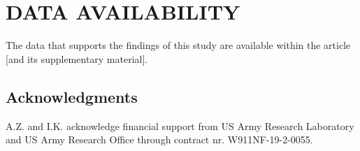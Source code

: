 \documentclass[pre,twocolumn,aps,superscriptaddress,showpacs]{revtex4-1}
\begin{document}
\section*{ DATA AVAILABILITY}
The data that supports the findings of this study are available within the article [and its supplementary material].\\






\subsection*{Acknowledgments} 
A.Z. and I.K. acknowledge financial support from US Army Research Laboratory and US Army Research Office through contract nr. W911NF-19-2-0055. 


\end{document}
